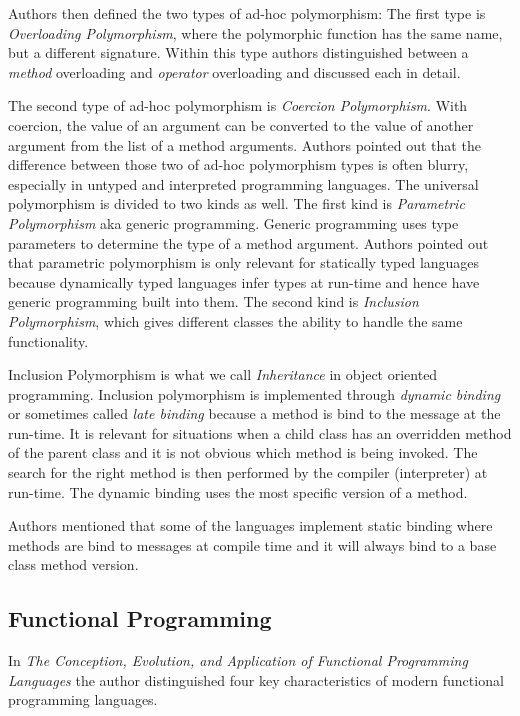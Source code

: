 \documentclass[12pt,twoside,a4paper]{report}
\begin{document}
Authors then defined the two types of ad-hoc polymorphism: The first type is \textit{Overloading Polymorphism}, where the polymorphic function has the same name, but a different signature. Within this type authors distinguished between a \textit{method} overloading and \textit{operator} overloading and discussed each in detail.\par
The second type of ad-hoc polymorphism is \textit{Coercion Polymorphism}. With coercion, the value of an argument can be converted to the value of another argument from the list of a method arguments. Authors pointed out that the difference between those two of ad-hoc polymorphism types is often blurry, especially in untyped and interpreted programming languages. The universal polymorphism is divided to two kinds as well. The first kind is \textit{Parametric Polymorphism} aka generic programming. Generic programming uses type parameters to determine the type of a method argument. Authors pointed out that parametric polymorphism is only relevant for statically typed languages because dynamically typed languages infer types at run-time and hence have generic programming built into them. The second kind is \textit{Inclusion Polymorphism}, which gives different classes the ability to handle the same functionality.

Inclusion Polymorphism is what we call \textit{Inheritance} in object oriented programming. Inclusion polymorphism is implemented through \textit{dynamic binding} or sometimes called \textit{late binding} because a method is bind to the message at the run-time. It is relevant for situations when a child class has an overridden method of the parent class and it is not obvious which method is being invoked. The search for the right method is then performed by the compiler (interpreter) at run-time. The dynamic binding uses the most specific version of a method.\par
Authors mentioned that some of the languages implement static binding where methods are bind to messages at compile time and it will always bind to a base class method version.

\subsection{Functional Programming}\label{2.3.2}
In \textit{The Conception, Evolution, and Application of Functional Programming Languages}\cite{12} the author distinguished four key characteristics of modern functional programming languages.
\end{document}
